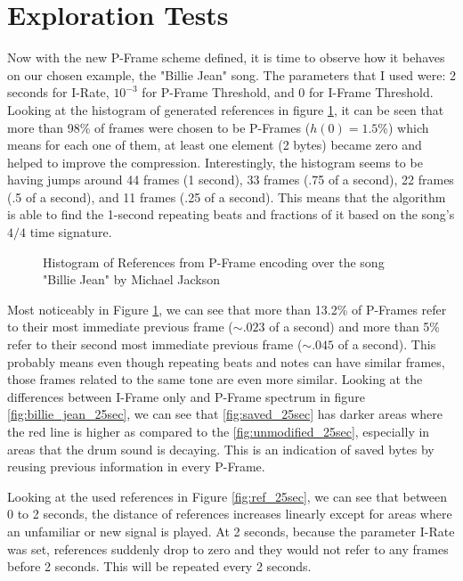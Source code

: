 \section{Exploration Tests}
\label{sec:tests}

Now with the new P-Frame scheme defined, it is time to observe how it behaves on our chosen example, the "Billie Jean" song. The parameters that I used were: 2 seconds for I-Rate, $10^{-3}$ for P-Frame Threshold, and 0 for I-Frame Threshold. Looking at the histogram of generated references in figure \ref{fig:hist}, it can be seen that more than 98\% of frames were chosen to be P-Frames ($h(0)=1.5\%$) which means for each one of them, at least one element (2 bytes) became zero and helped to improve the compression. Interestingly, the histogram seems to be having jumps around 44 frames (1 second), 33 frames (.75 of a second), 22 frames (.5 of a second), and 11 frames (.25 of a second). This means that the algorithm is able to find the 1-second repeating beats and fractions of it based on the song's $4/4$ time signature. 

\begin{figure}[ht] 
    \centering
    
    \caption{Histogram of References from P-Frame encoding over the song "Billie Jean" by Michael Jackson}
    \label{fig:hist}
\end{figure}

Most noticeably in Figure \ref{fig:hist}, we can see that more than 13.2\% of P-Frames refer to their most immediate previous frame ($\sim .023$ of a second) and more than 5\% refer to their second most immediate previous frame ($\sim .045$ of a second). This probably means even though repeating beats and notes can have similar frames, those frames related to the same tone are even more similar. Looking at the differences between I-Frame only and P-Frame spectrum in figure \ref{fig:billie_jean_25sec}, we can see that \ref{fig:saved_25sec} has darker areas where the red line is higher as compared to the \ref{fig:unmodified_25sec}, especially in areas that the drum sound is decaying. This is an indication of saved bytes by reusing previous information in every P-Frame.

Looking at the used references in Figure \ref{fig:ref_25sec}, we can see that between 0 to 2 seconds, the distance of references increases linearly except for areas where an unfamiliar or new signal is played. At 2 seconds, because the parameter I-Rate was set, references suddenly drop to zero and they would not refer to any frames before 2 seconds. This will be repeated every 2 seconds.

